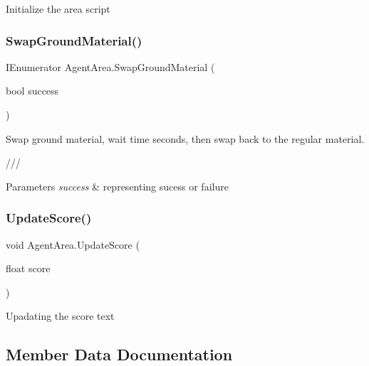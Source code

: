 Initialize the area script 

\mbox{\label{class_agent_area_a2324888e59275143c15b71a4370cbc36}} 
\subsubsection{\texorpdfstring{SwapGroundMaterial()}{SwapGroundMaterial()}}
{\footnotesize\ttfamily I\+Enumerator Agent\+Area.\+Swap\+Ground\+Material (\begin{DoxyParamCaption}\item[{bool}]{success }\end{DoxyParamCaption})}



Swap ground material, wait time seconds, then swap back to the regular material. 

/// 
\begin{DoxyParams}{Parameters}
{\em success} & representing sucess or failure\\
\hline
\end{DoxyParams}
\mbox{\label{class_agent_area_acad084bde8fa76938b06896cfef7befb}} 
\subsubsection{\texorpdfstring{UpdateScore()}{UpdateScore()}}
{\footnotesize\ttfamily void Agent\+Area.\+Update\+Score (\begin{DoxyParamCaption}\item[{float}]{score }\end{DoxyParamCaption})}



Upadating the score text 



\subsection{Member Data Documentation}
\mbox{\label{class_agent_area_a418d0b4fb39de6bd36d27e5be38cdd05}} 
